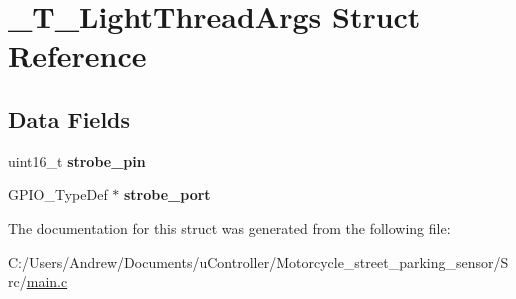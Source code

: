 \hypertarget{struct___t___light_thread_args}{}\section{\+\_\+\+T\+\_\+\+Light\+Thread\+Args Struct Reference}
\label{struct___t___light_thread_args}
\subsection*{Data Fields}
\begin{DoxyCompactItemize}
\item 
\mbox{\label{struct___t___light_thread_args_ac24fe7d711ffb6fdea10e438f8ddb196}} 
uint16\+\_\+t {\bfseries strobe\+\_\+pin}
\item 
\mbox{\label{struct___t___light_thread_args_a8dfe97d58fa08a7b9d8859ebd640017f}} 
G\+P\+I\+O\+\_\+\+Type\+Def $\ast$ {\bfseries strobe\+\_\+port}
\end{DoxyCompactItemize}


The documentation for this struct was generated from the following file\+:\begin{DoxyCompactItemize}
\item 
C\+:/\+Users/\+Andrew/\+Documents/u\+Controller/\+Motorcycle\+\_\+street\+\_\+parking\+\_\+sensor/\+Src/\mbox{\hyperlink{main_8c}{main.\+c}}\end{DoxyCompactItemize}
